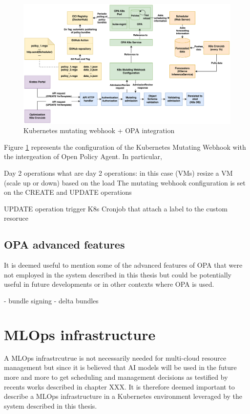 \begin{figure}[htb]
\centering
\includegraphics[width=1\linewidth]{images/mutating_webhook+OPA_integration.png}
\caption{Kubernetes mutating webhook + OPA integration}
\label{fig:webhook+opa}
\end{figure}

Figure \ref{fig:webhook+opa} represents the configuration of the Kubernetes Mutating Webhook with the intergeation of Open Policy Agent.
In particular, 




Day 2 operations
what are day 2 operations: in this case (VMs) resize a VM (scale up or down) based on the load
The mutating webhook configuration is set on the CREATE and UPDATE operations

UPDATE operation trigger
K8s Cronjob that attach a label to the custom resoruce 

\subsection{OPA advanced features}

It is deemed useful to mention some of the advanced features of OPA that were not employed in the system described in this thesis but could be potentially useful in future developments or in other contexts where OPA is used.

- bundle signing
- delta bundles

\newpage

\section{MLOps infrastructure}

A MLOps infrastrcutrue is not necessarily needed for multi-cloud resource management but since it is believed that AI models will be used in the future more and more to get scheduling and management decisions
as testified by recents works described in chapter XXX.
It is therefore deemed important to describe a MLOps infrastructure in a Kubernetes environment leveraged by the system described in this thesis.

